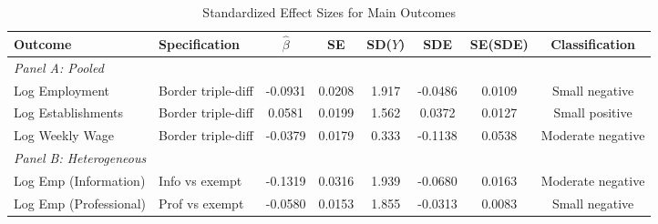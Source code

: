 \begin{table}[H]
\centering
\caption{Standardized Effect Sizes for Main Outcomes}
\label{tab:sde}
\begin{adjustbox}{max width=\textwidth}
\begin{threeparttable}
\begin{tabular}{llcccccc}
\toprule
Outcome & Specification & $\hat{\beta}$ & SE & SD($Y$) & SDE & SE(SDE) & Classification \\
\midrule
\multicolumn{8}{l}{\textit{Panel A: Pooled}} \\
Log Employment & Border triple-diff & -0.0931 & 0.0208 & 1.917 & -0.0486 & 0.0109 & Small negative \\
Log Establishments & Border triple-diff & 0.0581 & 0.0199 & 1.562 & 0.0372 & 0.0127 & Small positive \\
Log Weekly Wage & Border triple-diff & -0.0379 & 0.0179 & 0.333 & -0.1138 & 0.0538 & Moderate negative \\
\midrule
\multicolumn{8}{l}{\textit{Panel B: Heterogeneous}} \\
Log Emp (Information) & Info vs exempt & -0.1319 & 0.0316 & 1.939 & -0.0680 & 0.0163 & Moderate negative \\
Log Emp (Professional) & Prof vs exempt & -0.0580 & 0.0153 & 1.855 & -0.0313 & 0.0083 & Small negative \\
\bottomrule
\end{tabular}
\begin{tablenotes}[flushleft]
\footnotesize

\end{tablenotes}
\end{threeparttable}
\end{adjustbox}
\end{table}
